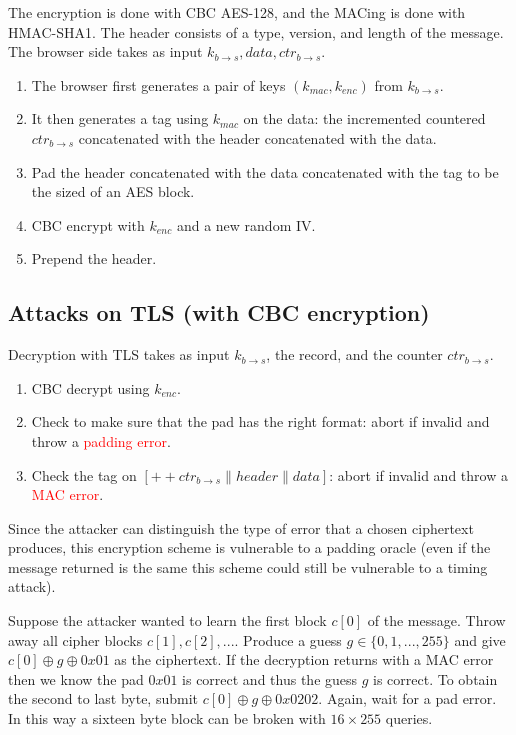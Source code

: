 \documentclass[twoside]{article}
\def\xor{\oplus}
\begin{document}
The encryption is done with CBC AES-128, and the MACing is done with HMAC-SHA1. The header consists of a type, version, and length of the message. The browser side takes as input $k_{b \rightarrow s}, data, ctr_{b \rightarrow s}$. 
\begin{enumerate}
\item The browser first generates a pair of keys $(k_{mac}, k_{enc})$ from $k_{b \rightarrow s}$.
\item It then generates a tag using $k_{mac}$ on the data: the incremented countered $ctr_{b \rightarrow s}$ concatenated with the header concatenated with the data.
\item Pad the header concatenated with the data concatenated with the tag to be the sized of an AES block.
\item CBC encrypt with $k_{enc}$ and a new random IV.
\item Prepend the header. 
\end{enumerate}

\subsection{Attacks on TLS (with CBC encryption)}

Decryption with TLS takes as input $k_{b \rightarrow s}$, the record, and the counter $ctr_{b \rightarrow s}$. 
\begin{enumerate}
\item CBC decrypt using $k_{enc}$.
\item Check to make sure that the pad has the right format: abort if invalid and throw a \textcolor{red}{padding error}.
\item Check the tag on $[++ctr_{b \rightarrow s} \parallel header \parallel data]$: abort if invalid and throw a \textcolor{red}{MAC error}.
\end{enumerate}

Since the attacker can distinguish the type of error that a chosen ciphertext produces, this encryption scheme is vulnerable to a padding oracle (even if the message returned is the same this scheme could still be vulnerable to a timing attack). 

Suppose the attacker wanted to learn the first block $c[0]$ of the message. Throw away all cipher blocks $c[1], c[2], ...$. Produce a guess $g \in \{0, 1, ..., 255\}$ and give $c[0] \xor g \xor 0x01$ as the ciphertext. If the decryption returns with a MAC error then we know the pad $0x01$ is correct and thus the guess $g$ is correct. To obtain the second to last byte, submit $c[0] \xor g \xor 0x0202$. Again, wait for a pad error. In this way a sixteen byte block can be broken with $16 \times 255$ queries.  
\end{document}
